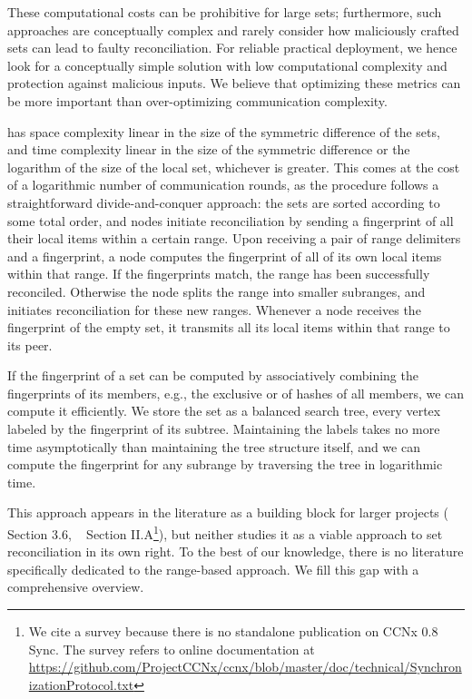 \documentclass[conference]{IEEEtran}
\begin{document}
These computational costs can be prohibitive for large sets; furthermore, such approaches are conceptually complex and rarely consider how maliciously crafted sets can lead to faulty reconciliation. For reliable practical deployment, we hence look for a conceptually simple solution with low computational complexity and protection against malicious inputs. We believe that optimizing these metrics can be more important than over-optimizing communication complexity.

 has space complexity linear in the size of the symmetric difference of the sets, and time complexity linear in the size of the symmetric difference or the logarithm of the size of the local set, whichever is greater. This comes at the cost of a logarithmic number of communication rounds, as the procedure follows a straightforward divide-and-conquer approach: the sets are sorted according to some total order, and nodes initiate reconciliation by sending a fingerprint of all their local items within a certain range. Upon receiving a pair of range delimiters and a fingerprint, a node computes the fingerprint of all of its own local items within that range. If the fingerprints match, the range has been successfully reconciled. Otherwise the node splits the range into smaller subranges, and initiates reconciliation for these new ranges. Whenever a node receives the fingerprint of the empty set, it transmits all its local items within that range to its peer.

If the fingerprint of a set can be computed by associatively combining the fingerprints of its members, e.g., the exclusive or of hashes of all members, we can compute it efficiently. We store the set as a balanced search tree, every vertex labeled by the fingerprint of its subtree. Maintaining the labels takes no more time asymptotically than maintaining the tree structure itself, and we can compute the fingerprint for any subrange by traversing the tree in logarithmic time.

This approach appears in the literature as a building block for larger projects (\cite{chen1999prototype} Section 3.6, ~\cite{shang2017survey} Section II.A\footnote{We cite a survey because there is no standalone publication on CCNx 0.8 Sync. The survey refers to online documentation at \url{https://github.com/ProjectCCNx/ccnx/blob/master/doc/technical/SynchronizationProtocol.txt}}), but neither studies it as a viable approach to set reconciliation in its own right. To the best of our knowledge, there is no literature specifically dedicated to the range-based approach. We fill this gap with a comprehensive overview.
\end{document}
